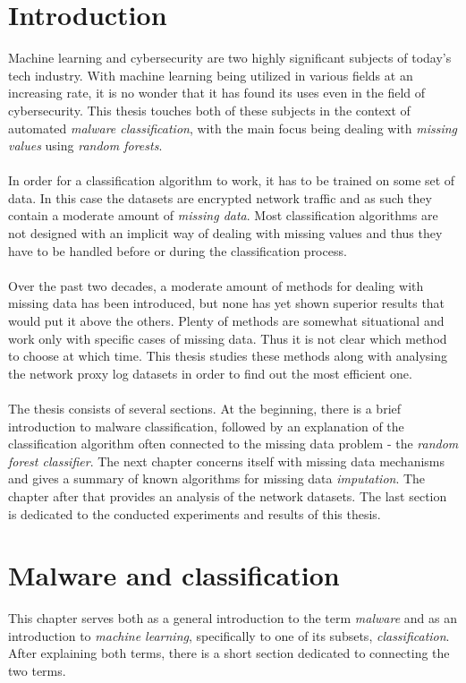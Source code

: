 \documentclass[11pt]{article}
\begin{document}
  \section*{Introduction}
    Machine learning and cybersecurity are two highly significant subjects of today's tech industry. With machine learning being utilized in various fields at an increasing rate, it is no wonder that it has found its uses even in the field of cybersecurity. This thesis touches both of these subjects in the context of automated {\it malware classification}, with the main focus being dealing with {\it missing values} using {\it random forests}.
    \\~\\
    In order for a classification algorithm to work, it has to be trained on some set of data. In this case the datasets are encrypted network traffic and as such they contain a moderate amount of {\it missing data}. Most classification algorithms are not designed with an implicit way of dealing with missing values and thus they have to be handled before or during the classification process.
    \\~\\
    Over the past two decades, a moderate amount of methods for dealing with missing data has been introduced, but none has yet shown superior results that would put it above the others. Plenty of methods are somewhat situational and work only with specific cases of missing data. Thus it is not clear which method to choose at which time. This thesis studies these methods along with analysing the network proxy log datasets in order to find out the most efficient one.
    \\~\\
    The thesis consists of several sections. At the beginning, there is a brief introduction to malware classification, followed by an explanation of the classification algorithm often connected to the missing data problem - the {\it random forest classifier}. The next chapter concerns itself with missing data mechanisms and gives a summary of known algorithms for missing data {\it imputation}. The chapter after that provides an analysis of the network datasets. The last section is dedicated to the conducted experiments and results of this thesis.
  \newpage
  \section{Malware and classification}
      This chapter serves both as a general introduction to the term {\it malware} and as an introduction to {\it machine learning}, specifically to one of its subsets, {\it classification}. After explaining both terms, there is a short section dedicated to connecting the two terms.
\end{document}
